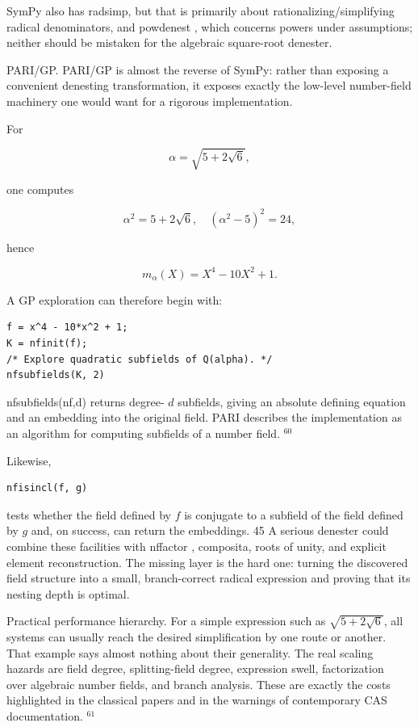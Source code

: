 \documentclass[10pt]{article}
\begin{document}
SymPy also has radsimp, but that is primarily about rationalizing/simplifying radical denominators, and powdenest , which concerns powers under assumptions; neither should be mistaken for the algebraic square-root denester.

PARI/GP. PARI/GP is almost the reverse of SymPy: rather than exposing a convenient denesting transformation, it exposes exactly the low-level number-field machinery one would want for a rigorous implementation.

For

$$
\alpha=\sqrt{5+2 \sqrt{6}},
$$

one computes

$$
\alpha^{2}=5+2 \sqrt{6}, \quad\left(\alpha^{2}-5\right)^{2}=24,
$$

hence

$$
m_{\alpha}(X)=X^{4}-10 X^{2}+1 .
$$

A GP exploration can therefore begin with:

\begin{verbatim}
f = x^4 - 10*x^2 + 1;
K = nfinit(f);
/* Explore quadratic subfields of Q(alpha). */
nfsubfields(K, 2)
\end{verbatim}

nfsubfields(nf,d) returns degree- $d$ subfields, giving an absolute defining equation and an embedding into the original field. PARI describes the implementation as an algorithm for computing subfields of a number field. ${ }^{60}$

Likewise,

\begin{verbatim}
nfisincl(f, g)
\end{verbatim}

tests whether the field defined by $f$ is conjugate to a subfield of the field defined by $g$ and, on success, can return the embeddings. 45 A serious denester could combine these facilities with nffactor , composita, roots of unity, and explicit element reconstruction. The missing layer is the hard one: turning the discovered field structure into a small, branch-correct radical expression and proving that its nesting depth is optimal.

Practical performance hierarchy. For a simple expression such as $\sqrt{5+2 \sqrt{6}}$, all systems can usually reach the desired simplification by one route or another. That example says almost nothing about their generality. The real scaling hazards are field degree, splitting-field degree, expression swell, factorization\\
over algebraic number fields, and branch analysis. These are exactly the costs highlighted in the classical papers and in the warnings of contemporary CAS documentation. ${ }^{61}$
\end{document}
